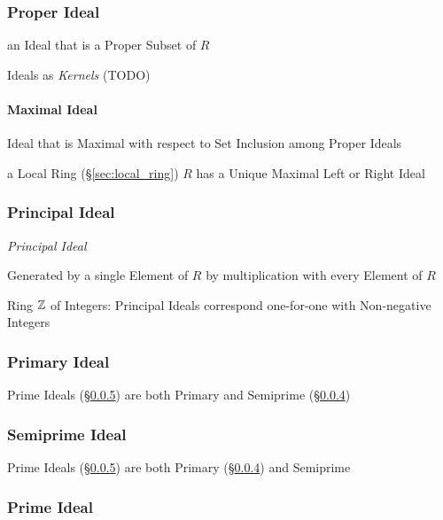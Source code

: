 \subsubsection{Proper Ideal}\label{sec:proper_ideal}

an Ideal that is a Proper Subset of $R$

Ideals as \emph{Kernels} (TODO)


\paragraph{Maximal Ideal}\label{sec:maximal_ideal}\hfill

Ideal that is Maximal with respect to Set Inclusion among Proper Ideals

a Local Ring (\S\ref{sec:local_ring}) $R$ has a Unique Maximal Left or Right
Ideal



\subsubsection{Principal Ideal}\label{sec:principal_ideal}

\emph{Principal Ideal}

Generated by a single Element of $R$ by multiplication with every
Element of $R$

Ring $\mathbb{Z}$ of Integers: Principal Ideals correspond one-for-one with
Non-negative Integers



\subsubsection{Primary Ideal}\label{sec:primary_ideal}

Prime Ideals (\S\ref{sec:prime_ideal}) are both Primary and Semiprime
(\S\ref{sec:semiprime_ideal})



\subsubsection{Semiprime Ideal}\label{sec:semiprime_ideal}

Prime Ideals (\S\ref{sec:prime_ideal}) are both Primary
(\S\ref{sec:semiprime_ideal}) and Semiprime



\subsubsection{Prime Ideal}\label{sec:prime_ideal}

